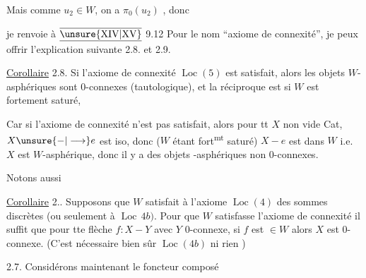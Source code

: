 Mais comme $u_2\in W$, on a $\pi_0(u_2)$ , donc



je renvoie à $\overline{\underline{\unsure{\mathrm{XIV}|\mathrm{XV}}}}$ 9.12  Pour le nom ``axiome de connexité'', je peux offrir l'explication suivante 2.8. et 2.9.

\uline{Corollaire} 2.8. Si  l'axiome de connexité $\operatorname{Loc}(5)$ est satisfait, alors les objets $W$-asphériques sont $0$-connexes (tautologique), et la réciproque est  si $W$ est fortement saturé, 


Car si l'axiome de connexité n'est pas satisfait, alors pour tt $X$ non vide  Cat, $X\unsure{{-}|\longrightarrow}e$ est iso, donc ($W$ étant fort\textsuperscript{mt} saturé) $X{-}e$ est dans $W$ i.e. $X$ est  $W$-asphérique, donc il y a des objets -asphériques non $0$-connexes.


Notons aussi

\uline{Corollaire} 2.. Supposons que $W$ satisfait à l'axiome $\operatorname{Loc}(4)$ des sommes discrètes (ou seulement à $\operatorname{Loc}\,4b)$. Pour que $W$ satisfasse l'axiome de connexité il suffit que pour tte flèche $f:X{-}Y$ avec $Y$ $0$-connexe, si $f$ est  $\in W$ alors $X$ est $0$-connexe. (C'est nécessaire bien sûr   $\operatorname{Loc}(4b)$ ni rien  )



2.7.  Considérons maintenant le foncteur composé


